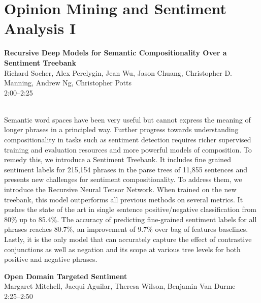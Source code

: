 \documentclass[twoside,makeidx]{book}
\begin{document}
\section{Opinion Mining and Sentiment Analysis I}
\vspace{-1em}
\par\vspace{2em}\noindent%
\begin{minipage}{\linewidth}%
\begin{center}
\textbf{\normalsize Recursive Deep Models for Semantic Compositionality Over a Sentiment Treebank}\\
\normalsize  Richard Socher,  Alex Perelygin,  Jean Wu,  Jason Chuang,  Christopher D. Manning,  Andrew Ng,  Christopher Potts\\
{\small 2:00--2:25}\\
\end{center}
\end{minipage}\\[0.5em]
\nopagebreak%
\noindent%
{\small Semantic word spaces have been very useful but cannot express the meaning of longer phrases in a principled way. Further progress towards understanding compositionality in tasks such as sentiment detection requires richer supervised training and evaluation resources and more powerful models of composition. To remedy this, we introduce a Sentiment Treebank. It includes fine grained sentiment labels for 215,154 phrases in the parse trees of 11,855 sentences and presents new challenges for sentiment compositionality. To address them, we introduce the Recursive Neural Tensor Network. When trained on the new treebank, this model outperforms all previous methods on several metrics. It pushes the state of the art in single sentence positive/negative classification from 80\% up to 85.4\%. The accuracy of predicting fine-grained sentiment labels for all phrases reaches 80.7\%, an improvement of 9.7\% over bag of features baselines. Lastly, it is the only model that can accurately capture the effect of contrastive conjunctions as well as negation and its scope at various tree levels for both positive and negative phrases.}
\par\vspace{2em}\noindent%
\begin{minipage}{\linewidth}%
\begin{center}
\textbf{\normalsize Open Domain Targeted Sentiment}\\
\normalsize  Margaret Mitchell,  Jacqui Aguilar,  Theresa Wilson,  Benjamin Van Durme\\
{\small 2:25--2:50}\\
\end{center}
\end{minipage}\\[0.5em]
\end{document}

